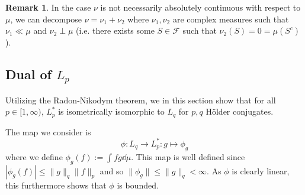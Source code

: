 \documentclass[]{article}
\theoremstyle{definition}
\newtheorem*{remark}{Remark}
\begin{document}
\begin{remark}
  In the case \(\nu\) is not necessarily absolutely continuous with respect to \(\mu\), we can  
  decompose \(\nu = \nu_1 + \nu_2\) where \(\nu_1, \nu_2\) are complex measures such that 
  \(\nu_1 \ll \mu\) and \(\nu_2 \perp \mu\) (i.e. there exists some \(S \in \mathcal{F}\) such that 
  \(\nu_2(S) = 0 = \mu(S^c)\)).
\end{remark}

\subsection{Dual of \texorpdfstring{\(L_p\)}{Lp}}

Utilizing the Radon-Nikodym theorem, we in this section show that for all \(p \in [1, \infty)\), 
\(L_p^*\) is isometrically isomorphic to \(L_q\) for \(p, q\) Hölder conjugates.

The map we consider is 
\[\phi : L_q \to L_p^* : g \mapsto \phi_g\]
where we define \(\phi_g(f) := \int fg \dd \mu\). This map is well defined since 
\(|\phi_g(f)| \le \|g\|_q\|f\|_p\) and so \(\|\phi_g\| \le \|g\|_q < \infty\). As \(\phi\) is 
clearly linear, this furthermore shows that \(\phi\) is bounded.
\end{document}
